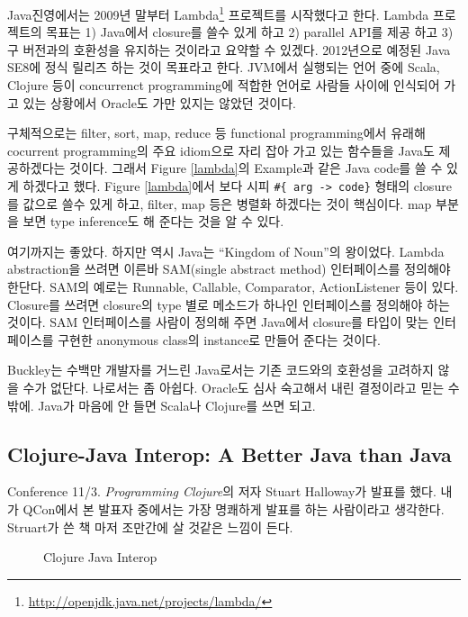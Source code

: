 \documentclass[11pt]{article}
\begin{document}
Java진영에서는 2009년 
말부터 Lambda\footnote{\url{http://openjdk.java.net/projects/lambda/}}
프로젝트를 시작했다고 한다. Lambda 프로젝트의 목표는 1) Java에서 closure를 
쓸수 있게 하고 2) parallel API를 제공 하고 3) 구 버전과의 호환성을 유지하는 
것이라고 요약할 수 있겠다.
2012년으로 예정된 Java SE8에 정식 릴리즈 하는 것이 목표라고 한다.
JVM에서 실행되는 언어 중에 Scala, Clojure 등이 concurrenct programming에 
적합한 언어로 사람들 사이에 인식되어 가고 있는 상황에서 Oracle도 가만 있지는 
않았던 것이다.

구체적으로는 filter, sort, map, reduce 등 functional programming에서 유래해 
cocurrent programming의 주요 idiom으로 자리 잡아 가고 있는 함수들을 Java도
제공하겠다는 것이다. 그래서 Figure \ref{lambda}의 Example과 같은 Java code를 쓸
수 있게 하겠다고 했다. Figure \ref{lambda}에서 보다 시피 
\verb=#{ arg -> code}= 형태의 closure를 값으로 쓸수 있게 하고, filter, map 
등은 병렬화 하겠다는 것이 핵심이다. map 부분을 보면 type inference도 해 
준다는 것을 알 수 있다.
 
여기까지는 좋았다. 하지만 역시 Java는 ``Kingdom of Noun''\cite{yegge}의 
왕이었다. Lambda abstraction을 쓰려면 이른바 SAM(single abstract method)
인터페이스를 정의해야 한단다.  SAM의 예로는 Runnable, Callable,
Comparator, ActionListener 등이 있다. Closure를 쓰려면 closure의 type 별로
메소드가 하나인 인터페이스를 정의해야 하는 것이다. SAM 인터페이스를 사람이
정의해 주면 Java에서 closure를 타입이 맞는 인터페이스를 구현한 anonymous 
class의 instance로 만들어 준다는 것이다.
 
Buckley는 수백만 개발자를 거느린 Java로서는 기존 코드와의 호환성을 고려하지 
않을 수가 없단다. 나로서는 좀 아쉽다. Oracle도 심사 숙고해서 내린 결정이라고 
믿는 수 밖에. Java가 마음에 안 들면 Scala나 Clojure를 쓰면 되고.

\subsection{Clojure-Java Interop: A Better Java than Java}

Conference 11/3.
\textit{Programming Clojure}\cite{halloway}의 저자 Stuart Halloway가 발표를 
했다. 내가 QCon에서 본 발표자 중에서는 가장 명쾌하게 발표를 하는 사람이라고 
생각한다. Struart가 쓴 책 마저 조만간에 살 것같은 느낌이 든다.
 
\begin{figure}[t]
    \begin{Frame}
        \begin{center}
        \end{center}
    \end{Frame}
    \caption{Clojure Java Interop}
    \label{clojure java}
\end{figure}
\end{document}
